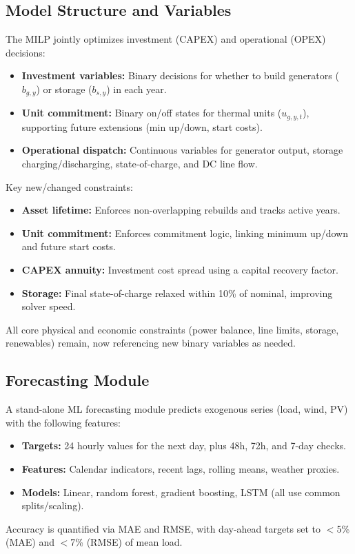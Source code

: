 \subsection{Model Structure and Variables}
The MILP jointly optimizes investment (CAPEX) and operational (OPEX) decisions:
\begin{itemize}
    \item \textbf{Investment variables:} Binary decisions for whether to build generators ($b_{g,y}$) or storage ($b_{s,y}$) in each year.
    \item \textbf{Unit commitment:} Binary on/off states for thermal units ($u_{g,y,t}$), supporting future extensions (min up/down, start costs).
    \item \textbf{Operational dispatch:} Continuous variables for generator output, storage charging/discharging, state-of-charge, and DC line flow.
\end{itemize}
Key new/changed constraints:
\begin{itemize}
    \item \textbf{Asset lifetime:} Enforces non-overlapping rebuilds and tracks active years.
    \item \textbf{Unit commitment:} Enforces commitment logic, linking minimum up/down and future start costs.
    \item \textbf{CAPEX annuity:} Investment cost spread using a capital recovery factor.
    \item \textbf{Storage:} Final state-of-charge relaxed within 10\% of nominal, improving solver speed.
\end{itemize}
All core physical and economic constraints (power balance, line limits, storage, renewables) remain, now referencing new binary variables as needed.

\subsection{Forecasting Module}
A stand-alone ML forecasting module predicts exogenous series (load, wind, PV) with the following features:
\begin{itemize}
    \item \textbf{Targets:} 24 hourly values for the next day, plus 48h, 72h, and 7-day checks.
    \item \textbf{Features:} Calendar indicators, recent lags, rolling means, weather proxies.
    \item \textbf{Models:} Linear, random forest, gradient boosting, LSTM (all use common splits/scaling).
\end{itemize}
Accuracy is quantified via MAE and RMSE, with day-ahead targets set to $<$5\% (MAE) and $<$7\% (RMSE) of mean load.

